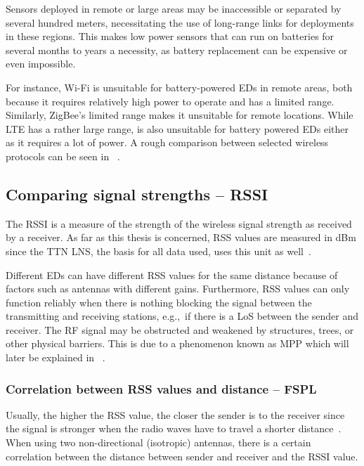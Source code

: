 Sensors deployed in remote or large areas may be inaccessible or separated by several hundred meters, necessitating the use of
long-range links for deployments in these regions.
This makes low power sensors that can run on batteries for several months to years a necessity, as battery replacement can be expensive or even impossible.

For instance, Wi-Fi is unsuitable for battery-powered \aclp{ED} in remote areas, both because it requires relatively high power to operate and has a limited range.
Similarly, ZigBee's limited range makes it unsuitable for remote locations.
While \ac{LTE} has a rather large range, is also unsuitable for battery powered \aclp{ED} either as it requires a lot of power.
A rough comparison between selected wireless protocols can be seen in ~\cite{wang_comparison_2021}.

\subsection{Comparing signal strengths – \acl{RSSI}}\label{sec:rssi}

The \acf{RSSI} is a measure of the strength of the wireless signal strength as received by a receiver.
As far as this thesis is concerned, \ac{RSS} values are measured in dBm since the \ac{TTN} \ac{LNS}, the basis for all data used, uses this unit as well~\cite{the_things_industries_bv_data_2023}.

Different \aclp{ED} can have different \ac{RSS} values for the same distance because of factors such as antennas with different gains.
Furthermore, \ac{RSS} values can only function reliably when there is nothing blocking the signal between the transmitting and receiving stations, e.g.,\ if there is a \ac{LoS} between the sender and receiver.
The \ac{RF} signal may be obstructed and weakened by structures, trees, or other physical barriers.
This is due to a phenomenon known as \acf{MPP} which will later be explained in ~\cite{kucherov_investigation_2021}.

\subsubsection{Correlation between \acs{RSS} values and distance – \acf{FSPL}}\label{sec:background-free-space-path-loss}

Usually, the higher the \ac{RSS} value, the closer the sender is to the receiver since the signal is stronger when the radio waves have to travel a shorter distance~\cite{stutzman_antenna_1981}.
When using two non-directional (isotropic) antennas, there is a certain correlation between the distance between sender and receiver and the \ac{RSSI} value.

